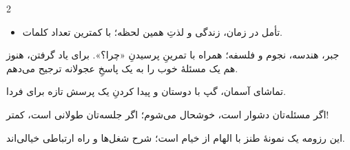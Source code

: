 \documentclass[11pt,a4paper,ragged2e,withhyper,rtl]{altacv}
\begin{document}
\begin{paracol}{2}
\begin{itemize}
  \item تأمل در زمان، زندگی و لذتِ همین لحظه؛ با کمترین تعداد کلمات.
\end{itemize}

جبر، هندسه، نجوم و فلسفه؛ همراه با تمرینِ پرسیدنِ «چرا؟».
برای یاد گرفتن، هنوز هم یک مسئلهٔ خوب را به یک پاسخِ عجولانه ترجیح می‌دهم.

\switchcolumn[0]


\smallskip
{}
\smallskip
{}
\smallskip
{}
\smallskip
{}

\par
\smallskip
{}\par
\smallskip
{}\par

\medskip
{}

تماشای آسمان، گپ با دوستان و پیدا کردنِ یک پرسش تازه برای فردا.

اگر مسئله‌تان دشوار است، خوشحال می‌شوم؛ اگر جلسه‌تان طولانی است، کمتر!

\bigskip
{\footnotesize\color{body!80}
این رزومه یک نمونهٔ طنز با الهام از خیام است؛ شرح شغل‌ها و راه ارتباطی خیالی‌اند.\par}

\end{paracol}
\end{document}
